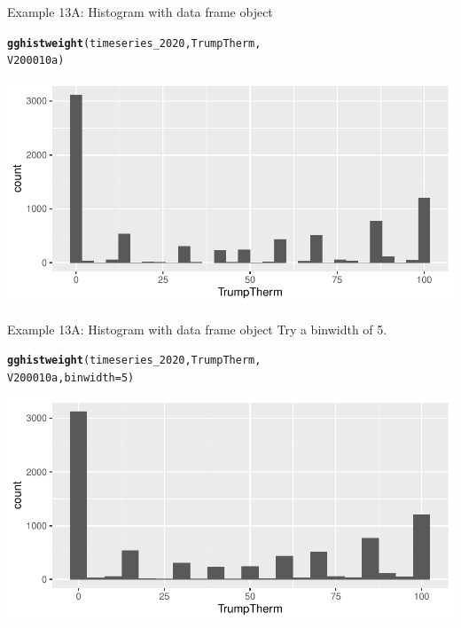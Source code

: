 \documentclass{beamer}\usepackage[]{graphicx}\usepackage[]{xcolor}
\makeatletter
\newcommand{\hlnum}[1]{\textcolor[rgb]{0.686,0.059,0.569}{#1}}%
\newcommand{\hlstd}[1]{\textcolor[rgb]{0.345,0.345,0.345}{#1}}%
\newcommand{\hlkwc}[1]{\textcolor[rgb]{0.333,0.667,0.333}{#1}}%
\newcommand{\hlkwd}[1]{\textcolor[rgb]{0.737,0.353,0.396}{\textbf{#1}}}%
\newenvironment{kframe}{%
 \def\at@end@of@kframe{}%
 \ifinner\ifhmode%
  \def\at@end@of@kframe{\end{minipage}}%
  \begin{minipage}{\columnwidth}%
 \fi\fi%
 \def\FrameCommand##1{\hskip\@totalleftmargin \hskip-\fboxsep
 \colorbox{shadecolor}{##1}\hskip-\fboxsep
     \hskip-\linewidth \hskip-\@totalleftmargin \hskip\columnwidth}%
 \MakeFramed {\advance\hsize-\width
   \@totalleftmargin\z@ \linewidth\hsize
   \@setminipage}}%
 {\par\unskip\endMakeFramed%
 \at@end@of@kframe}
\newenvironment{knitrout}{}{} %
\makeatother
\begin{document}
\begin{frame}[fragile]{Example 13A: Histogram with data frame object}
\begin{knitrout}
\color{fgcolor}\begin{kframe}
\begin{alltt}
\hlkwd{gghistweight}\hlstd{(timeseries_2020, TrumpTherm,}
    \hlstd{V200010a)}
\end{alltt}
\end{kframe}
\includegraphics[width=0.95\linewidth]{figure/unnamed-chunk-71-1} 
\end{knitrout}

\end{frame}

\begin{frame}[fragile]{Example 13A: Histogram with data frame object}
Try a binwidth of 5.
\begin{knitrout}
\color{fgcolor}\begin{kframe}
\begin{alltt}
\hlkwd{gghistweight}\hlstd{(timeseries_2020, TrumpTherm,}
    \hlstd{V200010a,} \hlkwc{binwidth} \hlstd{=} \hlnum{5}\hlstd{)}
\end{alltt}
\end{kframe}
\includegraphics[width=0.95\linewidth]{figure/unnamed-chunk-72-1} 
\end{knitrout}

\end{frame}
\end{document}
